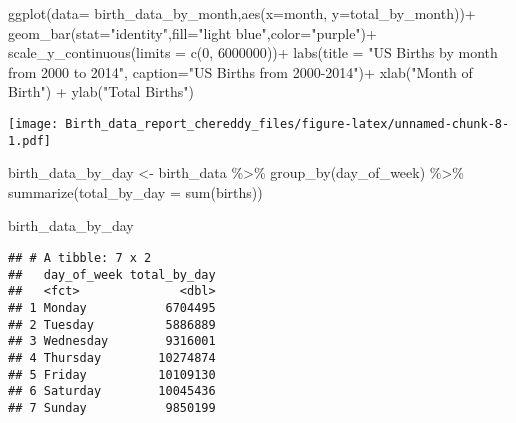 \documentclass[
]{article}
\newenvironment{Shaded}{\begin{snugshade}}{\end{snugshade}}
\newcommand{\AttributeTok}[1]{\textcolor[rgb]{0.77,0.63,0.00}{#1}}
\newcommand{\DecValTok}[1]{\textcolor[rgb]{0.00,0.00,0.81}{#1}}
\newcommand{\FunctionTok}[1]{\textcolor[rgb]{0.00,0.00,0.00}{#1}}
\newcommand{\NormalTok}[1]{#1}
\newcommand{\OtherTok}[1]{\textcolor[rgb]{0.56,0.35,0.01}{#1}}
\newcommand{\SpecialCharTok}[1]{\textcolor[rgb]{0.00,0.00,0.00}{#1}}
\newcommand{\StringTok}[1]{\textcolor[rgb]{0.31,0.60,0.02}{#1}}
\begin{document}
\begin{Shaded}
\begin{Highlighting}[]
\FunctionTok{ggplot}\NormalTok{(}\AttributeTok{data=}\NormalTok{ birth\_data\_by\_month,}\FunctionTok{aes}\NormalTok{(}\AttributeTok{x=}\NormalTok{month, }\AttributeTok{y=}\NormalTok{total\_by\_month))}\SpecialCharTok{+}
  \FunctionTok{geom\_bar}\NormalTok{(}\AttributeTok{stat=}\StringTok{"identity"}\NormalTok{,}\AttributeTok{fill=}\StringTok{"light blue"}\NormalTok{,}\AttributeTok{color=}\StringTok{"purple"}\NormalTok{)}\SpecialCharTok{+}
  \FunctionTok{scale\_y\_continuous}\NormalTok{(}\AttributeTok{limits =} \FunctionTok{c}\NormalTok{(}\DecValTok{0}\NormalTok{, }\DecValTok{6000000}\NormalTok{))}\SpecialCharTok{+}
  \FunctionTok{labs}\NormalTok{(}\AttributeTok{title =} \StringTok{"US Births by month from 2000 to 2014"}\NormalTok{,}
       \AttributeTok{caption=}\StringTok{"US Births from 2000{-}2014"}\NormalTok{)}\SpecialCharTok{+}
  \FunctionTok{xlab}\NormalTok{(}\StringTok{"Month of Birth"}\NormalTok{) }\SpecialCharTok{+}
  \FunctionTok{ylab}\NormalTok{(}\StringTok{"Total Births"}\NormalTok{)}
\end{Highlighting}
\end{Shaded}

\texttt{[image: Birth\_data\_report\_chereddy\_files/figure-latex/unnamed-chunk-8-1.pdf]}

\begin{Shaded}
\begin{Highlighting}[]
\NormalTok{birth\_data\_by\_day }\OtherTok{\textless{}{-}}\NormalTok{ birth\_data }\SpecialCharTok{\%\textgreater{}\%} 
  \FunctionTok{group\_by}\NormalTok{(day\_of\_week) }\SpecialCharTok{\%\textgreater{}\%} 
  \FunctionTok{summarize}\NormalTok{(}\AttributeTok{total\_by\_day =} \FunctionTok{sum}\NormalTok{(births))}

\NormalTok{birth\_data\_by\_day}
\end{Highlighting}
\end{Shaded}

\begin{verbatim}
## # A tibble: 7 x 2
##   day_of_week total_by_day
##   <fct>              <dbl>
## 1 Monday           6704495
## 2 Tuesday          5886889
## 3 Wednesday        9316001
## 4 Thursday        10274874
## 5 Friday          10109130
## 6 Saturday        10045436
## 7 Sunday           9850199
\end{verbatim}
\end{document}
